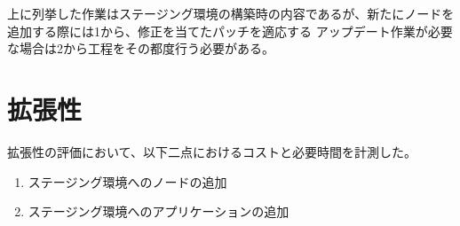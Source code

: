 上に列挙した作業はステージング環境の構築時の内容であるが、新たにノードを追加する際には1から、修正を当てたパッチを適応する
アップデート作業が必要な場合は2から工程をその都度行う必要がある。

\section{拡張性}
\label{evaluation:method}

拡張性の評価において、以下二点におけるコストと必要時間を計測した。

\begin{enumerate}
  \item ステージング環境へのノードの追加
  \item ステージング環境へのアプリケーションの追加
\end{enumerate}

